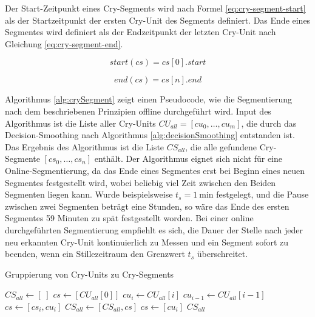 Der Start-Zeitpunkt eines Cry-Segments wird nach Formel \ref{eq:cry-segment-start} als der Startzeitpunkt der ersten Cry-Unit des Segments definiert. Das Ende eines Segmentes wird definiert als der Endzeitpunkt der letzten Cry-Unit nach Gleichung \ref{eq:cry-segment-end}.

\begin{equation}
start(cs) = cs[0].start
\label{eq:cry-segment-start}
\end{equation}

\begin{equation}
end(cs) = cs[n].end
\label{eq:cry-segment-end}
\end{equation}

Algorithmus \ref{alg:crySegment} zeigt einen Pseudocode, wie die Segmentierung nach dem beschriebenen Prinzipien offline durchgeführt wird. Input des Algorithmus ist die Liste aller Cry-Units $CU_{all} = [cu_0 ,\ldots, cu_m]$, die durch das Decision-Smoothing nach Algorithmus \ref{alg:decisionSmoothing} entstanden ist. Das Ergebnis des Algorithmus ist die Liste $CS_{all}$, die alle gefundene Cry-Segmente  $[cs_0 , \ldots ,  cs_n]$ enthält. Der Algorithmus eignet sich nicht für eine Online-Segmentierung, da das Ende eines Segmentes erst bei Beginn eines neuen Segmentes festgestellt wird, wobei beliebig viel Zeit zwischen den Beiden Segmenten liegen kann. Wurde beispielsweise $t_{s} = \SI{1}{\minute}$ festgelegt, und die Pause zwischen zwei Segmenten beträgt eine Stunden, so wäre das Ende des ersten Segmentes 59 Minuten zu spät festgestellt worden. Bei einer online durchgeführten Segmentierung empfiehlt es sich, die Dauer der Stelle nach jeder neu erkannten Cry-Unit kontinuierlich zu Messen und ein Segment sofort zu beenden, wenn ein Stillezeitraum den Grenzwert $t_s$ überschreitet.

\begin{algorithm}[H]
	\caption{Gruppierung von Cry-Units zu Cry-Segments}
	\label{alg:crySegment}
	\begin{algorithmic}[1]
		\State $ CS_{all} \gets [\;]$
		\State $ cs \gets [CU_{all}[0]]$
						\State $ cu_i \gets CU_{all}[i]$
						\State $cu_{i-1} \gets CU_{all}[i-1]$
								\State $cs \gets [cs_i , cu_i]$
						\Else
								\State $CS_{all} \gets [CS_{all}, cs]$
								\State $cs \gets [cu_i]$
						\EndIf
				\EndFor
		\Return $CS_{all}$
		
		\EndFunction
		
	\end{algorithmic}
\end{algorithm}

